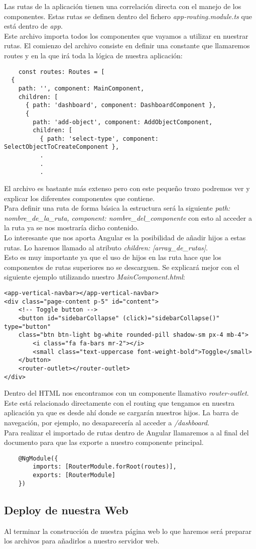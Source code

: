 Las rutas de la aplicación tienen una correlación directa con el manejo de los componentes. Estas rutas se definen dentro del fichero \textit{app-routing.module.ts} que está dentro de \textit{app}.
\\Este archivo importa todos los componentes que vayamos a utilizar en nuestrar rutas. El comienzo del archivo consiste en definir una constante que llamaremos routes y en la que irá toda la lógica de nuestra aplicación:
\begin{verbatim}
    const routes: Routes = [
  {
    path: '', component: MainComponent,
    children: [
      { path: 'dashboard', component: DashboardComponent },
      {
        path: 'add-object', component: AddObjectComponent,
        children: [
          { path: 'select-type', component: SelectObjectToCreateComponent },
          .
          .
          .
\end{verbatim}
El archivo es bastante más extenso pero con este pequeño trozo podremos ver y explicar los diferentes componentes que contiene.
\\Para definir una ruta de forma básica la estructura será la siguiente \textit{path: nombre\_de\_la\_ruta, component: nombre\_del\_componente} con esto al acceder a la ruta ya se nos mostraría dicho contenido.
\\Lo interesante que nos aporta Angular es la posibilidad de añadir hijos a estas rutas. Lo haremos llamado al atributo \textit{children: [array\_de\_rutas]}.
\\Esto es muy importante ya que el uso de hijos en las ruta hace que los componentes de rutas superiores no se descarguen. Se explicará mejor con el siguiente ejemplo utilizando nuestro \textit{MainComponent.html}:
\begin{verbatim}
<app-vertical-navbar></app-vertical-navbar>
<div class="page-content p-5" id="content">
    <!-- Toggle button -->
    <button id="sidebarCollapse" (click)="sidebarCollapse()" type="button"
    class="btn btn-light bg-white rounded-pill shadow-sm px-4 mb-4">
        <i class="fa fa-bars mr-2"></i>
        <small class="text-uppercase font-weight-bold">Toggle</small>
    </button>
    <router-outlet></router-outlet>
</div>
\end{verbatim}
Dentro del HTML nos encontramos con un componente llamativo \textit{router-outlet}. Este está relacionado directamente con el routing que tengamos en nuestra aplicación ya que es desde ahí donde se cargarán nuestros hijos. La barra de navegación, por ejemplo, no desaparecería al acceder a \textit{/dashboard}.
\\Para realizar el importado de rutas dentro de Angular llamaremos a \textit{\makeatletter@NgModule} al final del documento para que las exporte a nuestro componente principal.
\begin{verbatim}
    @NgModule({
        imports: [RouterModule.forRoot(routes)],
        exports: [RouterModule]
    })
\end{verbatim}

\subsection{Deploy de nuestra Web}
Al terminar la construcción de nuestra página web lo que haremos será preparar los archivos para añadirlos a nuestro servidor web.